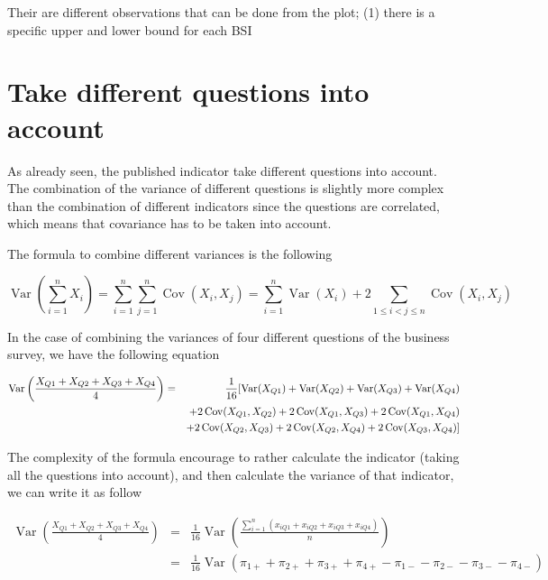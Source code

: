 \documentclass[12pt,a4paper,oneside]{book}
\DeclareMathOperator{\Var}{Var}
\DeclareMathOperator{\Cov}{Cov}
\begin{document}
Their are different observations that can be done from the plot;
(1) there is a specific upper and lower bound for each BSI



\section{Take different questions into account}

As already seen, the published indicator take different questions into account. 
The combination of the variance of different questions is slightly more complex than the combination of different indicators since the questions are correlated, which means that covariance has to be taken into account.

The formula to combine different variances is the following

\begin{equation}
\Var \left(\sum_{i=1}^{n} X_{i}\right) = \sum_{i=1}^{n} \sum_{j=1}^{n} \Cov\left(X_{i}, X_{j}\right)
= \sum_{i=1}^{n} \Var\left(X_{i}\right)+2 \sum_{1 \leq i<j \leq n} \Cov\left(X_{i}, X_{j}\right)
\end{equation} 

In the case of combining the variances of four different questions of the business survey, we have the following equation

\begin{eqnarray}
    \Var \left(\frac{X_{Q1} + X_{Q2} + X_{Q3} + X_{Q4}}{4} \right) &=& \frac{1}{16} \large[ \Var(X_{Q1}) + \Var(X_{Q2}) + \Var(X_{Q3}) + \Var(X_{Q4}) \nonumber \\
    && + 2 \Cov (X_{Q1},X_{Q2}) + 2 \Cov (X_{Q1},X_{Q3}) + 2 \Cov (X_{Q1},X_{Q4}) \nonumber \\
    &&  + 2 \Cov (X_{Q2},X_{Q3}) + 2 \Cov (X_{Q2},X_{Q4}) + 2 \Cov (X_{Q3},X_{Q4}) \large] \nonumber
\end{eqnarray}

The complexity of the formula encourage to rather calculate the indicator (taking all the questions into account), and then calculate the variance of that indicator, we can write it as follow

\begin{eqnarray}
    \Var \left(\frac{X_{Q1} + X_{Q2} + X_{Q3} + X_{Q4}}{4} \right) 
    &=& \frac{1}{16} \Var \left(\frac{\sum_{i=1}^n \left(x_{i Q1} + x_{i Q2} + x_{i Q3} + x_{i Q4} \right)}{n} \right) \nonumber \\
    &=& \frac{1}{16} \Var \left(\pi_{1+} + \pi_{2+} + \pi_{3+} + \pi_{4+} - \pi_{1-} - \pi_{2-} - \pi_{3-} - \pi_{4-}  \right) \nonumber \\
\end{eqnarray}
\end{document}
